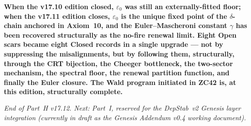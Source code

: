 \documentclass[12pt, a4paper]{article}
\begin{document}
\begin{keybox}[title={Part H v17.12 --- Closing Sentence}]
\textbf{When the v17.10 edition closed, $\varepsilon_0$ was still
an externally-fitted floor; when the v17.11 edition closes, $\varepsilon_0$
is the unique fixed point of the $\delta$-chain anchored in Axiom~10,
and the Euler--Mascheroni constant $\gamma$ has been recovered
structurally as the no-fire renewal limit. Eight Open scars
became eight Closed records in a single upgrade --- not by suppressing
the misalignments, but by following them, structurally, through the
CRT bijection, the Cheeger bottleneck, the two-sector mechanism,
the spectral floor, the renewal partition function, and finally
the Euler closure. The Wald program initiated in ZC42 is, at this
edition, structurally complete.}
\end{keybox}

\bigskip

\noindent
\textit{End of Part~H v17.12. Next: Part~I, reserved for the
DepStab~v2 Genesis layer integration (currently in draft as the
Genesis Addendum v0.4 working document).}
\end{document}
